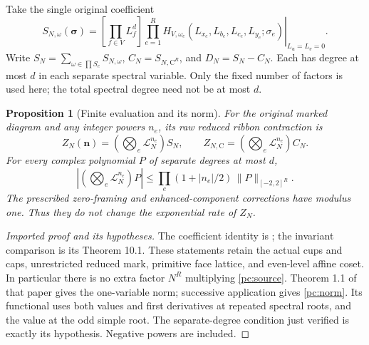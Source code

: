 \documentclass[11pt]{article}
\numberwithin{equation}{section}
\newtheorem{proposition}[theorem]{Proposition}
\theoremstyle{definition}\newtheorem{definition}[theorem]{Definition}
\theoremstyle{remark}\newtheorem{remark}[theorem]{Remark}
\newcommand{\C}{\mathrm C}
\begin{document}
Take the single original coefficient
\begin{equation}\label{pc:source}
 S_{N,\omega}(\boldsymbol\sigma)=
 \left[\prod_{f\in V}L_f^d\right]
 \left.\prod_{e=1}^R
 H_{V,\omega_e}(L_{x_e},L_{b_e},L_{c_e},L_{y_e};\sigma_e)
                                      \right|_{L_u=L_v=0}.
\end{equation}
Write \(S_N=\sum_{\omega\in\prod S_e}S_{N,\omega}\),
\(C_N=S_{N,\C^R}\), and \(D_N=S_N-C_N\).
Each has degree at most \(d\) in each separate spectral variable.
Only the fixed number of factors is used here; the total spectral
degree need not be at most \(d\).

\begin{proposition}[Finite evaluation and its norm]\label{pc:finite-import}
For the original marked diagram and any integer powers \(n_e\),
its raw reduced ribbon contraction is
\begin{equation}\label{pc:finite-filling}
 Z_N(\boldsymbol n)=
       \left(\bigotimes_e\mathcal L_N^{n_e}\right)S_N,\qquad
 Z_{N,\C}=
       \left(\bigotimes_e\mathcal L_N^{n_e}\right)C_N.
\end{equation}
For every complex polynomial \(P\) of separate degrees at most \(d\),
\begin{equation}\label{pc:norm}
 \left|\left(\bigotimes_e\mathcal L_N^{n_e}\right)P\right|
       \le\prod_e(1+|n_e|/2)\,\|P\|_{[-2,2]^R}.
\end{equation}
The prescribed zero-framing and enhanced-component corrections have
modulus one. Thus they do not change the exponential rate of \(Z_N\).
\end{proposition}
\begin{proof}[Imported proof and its hypotheses]
The coefficient identity is \cite[Theorem 9.1 and Corollary 9.2]{Finite};
the invariant comparison is its Theorem 10.1. These statements retain
the actual cups and caps, unrestricted reduced mark, primitive face
lattice, and even-level affine coset. In particular there is no
extra factor \(N^R\) multiplying \eqref{pc:source}.
Theorem 1.1 of that paper gives the one-variable norm;
successive application gives \eqref{pc:norm}. Its functional uses
both values and first derivatives at repeated spectral roots, and the
value at the odd simple root. The separate-degree condition just
verified is exactly its hypothesis. Negative powers are included.
\end{proof}
\end{document}
